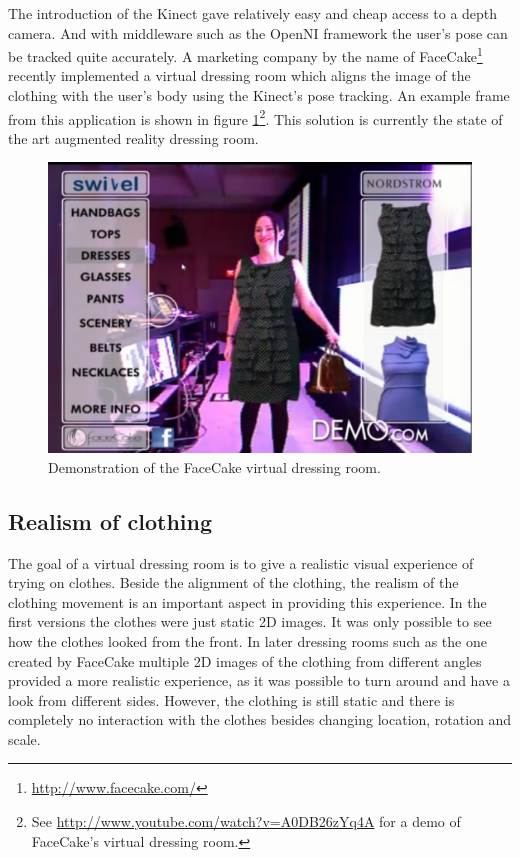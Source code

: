 \documentclass[twocolumn,a4paper]{article}
\begin{document}
The introduction of the Kinect gave relatively easy and cheap access to a depth camera. And with middleware such as the OpenNI framework the user's pose can be tracked quite accurately. A marketing company by the name of FaceCake\footnote{\url{http://www.facecake.com/}} recently  implemented a virtual dressing room which aligns the image of the clothing with the user's body using the Kinect's pose tracking. An example frame from this application is shown in figure \ref{fig:facecake}\footnote{See \url{http://www.youtube.com/watch?v=A0DB26zYq4A} for a demo of FaceCake's virtual dressing room.}. This solution is currently the state of the art augmented reality dressing room.

\begin{figure}[htp]
\centering
\includegraphics[scale=0.1]{facecake.png} 
\caption{Demonstration of the FaceCake virtual dressing room.}
\label{fig:facecake}
\end{figure}

\subsection{Realism of clothing}

The goal of a virtual dressing room is to give a realistic visual experience of trying on clothes. Beside the alignment of the clothing, the realism of the clothing movement is an important aspect in providing this experience. In the first versions the clothes were just static 2D images. It was only possible to see how the clothes looked from the front. In later dressing rooms such as the one created by FaceCake multiple 2D images of the clothing from different angles provided a more realistic experience, as it was possible to turn around and have a look from different sides. However, the clothing is still static and there is completely no interaction with the clothes besides changing location, rotation and scale.
\end{document}
